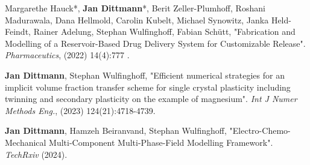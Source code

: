 \vspace{1 cm}
\begin{enumerate}[label={[\arabic*]}]
\item Margarethe Hauck*, \textbf{Jan Dittmann}*, Berit Zeller-Plumhoff, Roshani Madurawala, Dana Hellmold, Carolin Kubelt, Michael Synowitz, Janka Held-Feindt, Rainer Adelung, Stephan Wulfinghoff, Fabian Schütt, "Fabrication and Modelling of a Reservoir-Based Drug Delivery System for Customizable Release". \textit{Pharmaceutics}, (2022) 14(4):777 . 
\item \textbf{Jan Dittmann}, Stephan Wulfinghoff, "Efficient numerical strategies for an implicit volume fraction transfer scheme for single crystal plasticity including twinning and secondary plasticity on the example of magnesium". \textit{Int J Numer Methods Eng.}, (2023) 124(21):4718-4739.
\item \textbf{Jan Dittmann}, Hamzeh Beiranvand, Stephan Wulfinghoff, "Electro-Chemo-Mechanical Multi-Component Multi-Phase-Field Modelling Framework". \textit{TechRxiv} (2024).
\end{enumerate}